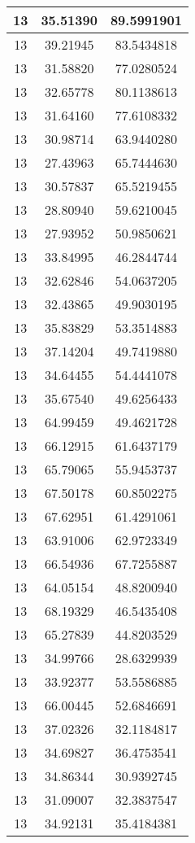 \documentclass[
]{book}
\begin{document}
\begin{tabular}{c|c|c}
\hline
13 & 35.51390 & 89.5991901\\
\hline
13 & 39.21945 & 83.5434818\\
\hline
13 & 31.58820 & 77.0280524\\
\hline
13 & 32.65778 & 80.1138613\\
\hline
13 & 31.64160 & 77.6108332\\
\hline
13 & 30.98714 & 63.9440280\\
\hline
13 & 27.43963 & 65.7444630\\
\hline
13 & 30.57837 & 65.5219455\\
\hline
13 & 28.80940 & 59.6210045\\
\hline
13 & 27.93952 & 50.9850621\\
\hline
13 & 33.84995 & 46.2844744\\
\hline
13 & 32.62846 & 54.0637205\\
\hline
13 & 32.43865 & 49.9030195\\
\hline
13 & 35.83829 & 53.3514883\\
\hline
13 & 37.14204 & 49.7419880\\
\hline
13 & 34.64455 & 54.4441078\\
\hline
13 & 35.67540 & 49.6256433\\
\hline
13 & 64.99459 & 49.4621728\\
\hline
13 & 66.12915 & 61.6437179\\
\hline
13 & 65.79065 & 55.9453737\\
\hline
13 & 67.50178 & 60.8502275\\
\hline
13 & 67.62951 & 61.4291061\\
\hline
13 & 63.91006 & 62.9723349\\
\hline
13 & 66.54936 & 67.7255887\\
\hline
13 & 64.05154 & 48.8200940\\
\hline
13 & 68.19329 & 46.5435408\\
\hline
13 & 65.27839 & 44.8203529\\
\hline
13 & 34.99766 & 28.6329939\\
\hline
13 & 33.92377 & 53.5586885\\
\hline
13 & 66.00445 & 52.6846691\\
\hline
13 & 37.02326 & 32.1184817\\
\hline
13 & 34.69827 & 36.4753541\\
\hline
13 & 34.86344 & 30.9392745\\
\hline
13 & 31.09007 & 32.3837547\\
\hline
13 & 34.92131 & 35.4184381\\

\end{tabular}
\end{document}
